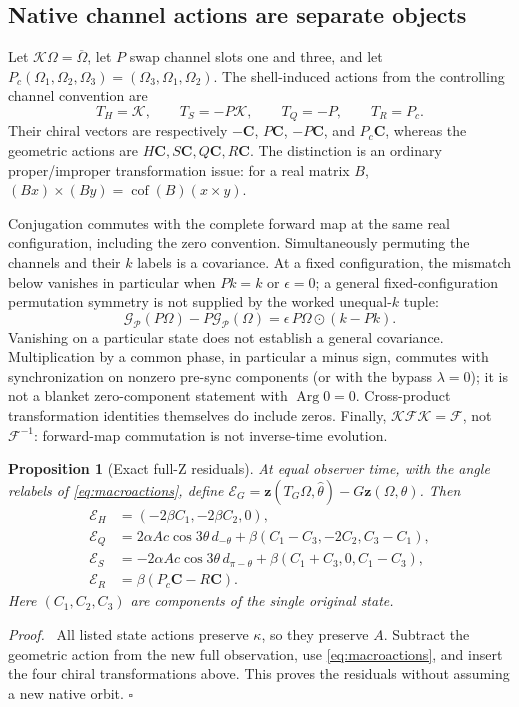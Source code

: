 \documentclass[11pt,a4paper]{article}
\numberwithin{equation}{section}
\newtheorem{proposition}[theorem]{Proposition}
\newenvironment{proof}[1][Proof]{\par\noindent\textit{#1.}\ \ignorespaces}
{\unskip\nobreak\hfill$\square$\par}
\newcommand{\cof}{\operatorname{cof}}
\newcommand{\Arg}{\operatorname{Arg}}
\newcommand{\zobs}{\mathbf z}
\newcommand{\chiral}{\mathbf C}
\newcommand{\Fmap}{\mathcal F}
\newcommand{\Gmap}{\mathcal G}
\newcommand{\Params}{\mathcal P}
\begin{document}
\subsection{Native channel actions are separate objects}
Let $\mathcal K\Omega=\overline\Omega$, let $P$ swap channel slots one and
three, and let $P_c(\Omega_1,\Omega_2,\Omega_3)=(\Omega_3,\Omega_1,\Omega_2)$.
The shell-induced actions from the controlling channel convention are
\[
T_H=\mathcal K,\qquad T_S=-P\mathcal K,\qquad
T_Q=-P,\qquad T_R=P_c.
\]
Their chiral vectors are respectively
$-\chiral$, $P\chiral$, $-P\chiral$, and $P_c\chiral$, whereas the geometric
actions are $H\chiral,S\chiral,Q\chiral,R\chiral$. The distinction is an
ordinary proper/improper transformation issue: for a real matrix $B$,
$(Bx)\times(By)=\cof(B)(x\times y)$.

Conjugation commutes with the complete forward map at the same real
configuration, including the zero convention. Simultaneously permuting the
channels and their $k$ labels is a covariance. At a fixed configuration,
the mismatch below vanishes in particular when $Pk=k$ or $\epsilon=0$;
a general fixed-configuration permutation symmetry is not supplied by
the worked unequal-$k$ tuple:
\[
\Gmap_{\Params}(P\Omega)-P\Gmap_{\Params}(\Omega)
=\epsilon\,P\Omega\odot(k-Pk).
\]
Vanishing on a particular state does not establish a general covariance.
Multiplication by a common phase, in particular a minus sign, commutes with
synchronization on nonzero pre-sync components (or with the bypass
$\lambda=0$); it is not a blanket zero-component statement with
$\Arg0=0$. Cross-product transformation identities themselves do include
zeros. Finally, $\mathcal K\Fmap\mathcal K=\Fmap$, not $\Fmap^{-1}$:
forward-map commutation is not inverse-time evolution.

\begin{proposition}[Exact full-Z residuals]\label{prop:residual}
At equal observer time, with the angle relabels of
\eqref{eq:macroactions}, define
$\mathcal E_G=\zobs(T_G\Omega,\widehat\theta)-G\zobs(\Omega,\theta)$.
Then
\begin{equation}\label{eq:residuals}
\begin{aligned}
\mathcal E_H&=(-2\beta C_1,-2\beta C_2,0),\\
\mathcal E_Q&=2\alpha Ac\cos3\theta\,d_{-\theta}
+\beta(C_1-C_3,-2C_2,C_3-C_1),\\
\mathcal E_S&=-2\alpha Ac\cos3\theta\,d_{\pi-\theta}
+\beta(C_1+C_3,0,C_1-C_3),\\
\mathcal E_R&=\beta(P_c\chiral-R\chiral).
\end{aligned}
\end{equation}
Here $(C_1,C_2,C_3)$ are components of the single original state.
\end{proposition}
\begin{proof}
All listed state actions preserve $\kappa$, so they preserve $A$.
Subtract the geometric action from the new full observation, use
\eqref{eq:macroactions}, and insert the four chiral transformations above.
This proves the residuals without assuming a new native orbit.
\end{proof}
\end{document}

